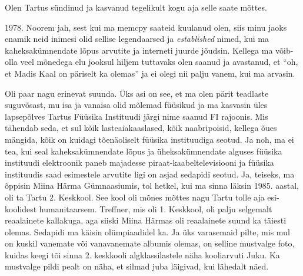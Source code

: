 
                 
Olen Tartus sündinud ja kasvanud tegelikult kogu aja selle saate mõttes. 


1978. Noorem jah, sest kui ma memcpy  saateid kuulanud olen, siis minu jaoks 
enamik neid inimesi olid sellise legendaarsed ja \emph{established} nimed, kui 
ma kaheksakümnendate lõpus arvutite ja interneti juurde jõudsin. Kellega ma 
võib-olla veel mõnedega elu jooksul hiljem tuttavaks olen saanud ja avastanud, 
et \enquote{oh, et Madis Kaal on  päriselt ka olemas} 
ja ei olegi nii palju vanem, kui ma arvasin.


Oli paar nagu erinevat suunda. Üks asi on see, et ma olen pärit teadlaste 
suguvõsast,  mu isa ja vanaisa olid mõlemad füüsikud  ja ma kasvasin üles 
lapsepõlves Tartus Füüsika Instituudi järgi nime saanud FI rajoonis. Mis 
tähendab seda, et sul kõik lasteaiakaaslased, kõik naabripoisid, kellega õues 
mängida, kõik on kuidagi tõenäoliselt füüsika instituudiga seotud. Ja noh, ma 
ei tea, kui seal kaheksakümnendate lõpus ja üheksakümnendate alguses füüsika 
instituudi elektroonik paneb majadesse piraat-kaabeltelevisiooni ja füüsika 
instituudis saad esimestele arvutite ligi on asjad sedapidi seotud. 
Ja, teiseks, ma õppisin Miina Härma Gümnaasiumis, tol hetkel, kui ma sinna läksin 1985. aastal, oli ta Tartu 2. 
Keskkool. See kool 
oli mõnes mõttes nagu Tartu tolle aja esi-koolidest humanitaarsem. 
Treffner, mis oli 1. Keskkool, oli 
palju selgemalt reaalainete kallakuga, aga siiski Miina Härmas oli  
reaalainete suund ka täiesti olemas. Sedapidi ma käisin olümpiaadidel ka. Ja 
üks 
varasemaid pilte, mis mul on kuskil vanemate või vanavanemate albumis olemas, 
on selline mustvalge foto, kuidas keegi tõi sinna 2. keskkooli 
algklassilastele näha kooliarvuti Juku. Ka mustvalge pildi 
pealt on näha, et silmad juba läigivad, kui lähedalt näed.

